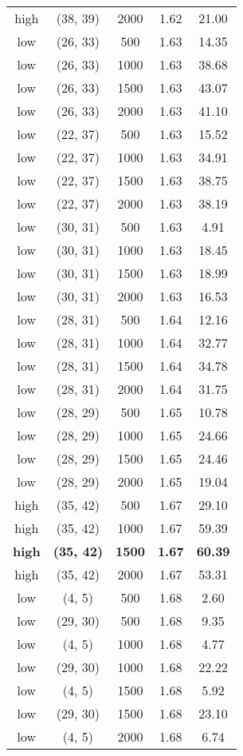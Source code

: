 \begin{tabular}{c c c c c}
high & (38, 39) &  2000 & 1.62 & 21.00 \\
low & (26, 33) &  500 & 1.63 & 14.35 \\
low & (26, 33) &  1000 & 1.63 & 38.68 \\
low & (26, 33) &  1500 & 1.63 & 43.07 \\
low & (26, 33) &  2000 & 1.63 & 41.10 \\
low & (22, 37) &  500 & 1.63 & 15.52 \\
low & (22, 37) &  1000 & 1.63 & 34.91 \\
low & (22, 37) &  1500 & 1.63 & 38.75 \\
low & (22, 37) &  2000 & 1.63 & 38.19 \\
low & (30, 31) &  500 & 1.63 & 4.91 \\
low & (30, 31) &  1000 & 1.63 & 18.45 \\
low & (30, 31) &  1500 & 1.63 & 18.99 \\
low & (30, 31) &  2000 & 1.63 & 16.53 \\
low & (28, 31) &  500 & 1.64 & 12.16 \\
low & (28, 31) &  1000 & 1.64 & 32.77 \\
low & (28, 31) &  1500 & 1.64 & 34.78 \\
low & (28, 31) &  2000 & 1.64 & 31.75 \\
low & (28, 29) &  500 & 1.65 & 10.78 \\
low & (28, 29) &  1000 & 1.65 & 24.66 \\
low & (28, 29) &  1500 & 1.65 & 24.46 \\
low & (28, 29) &  2000 & 1.65 & 19.04 \\
high & (35, 42) &  500 & 1.67 & 29.10 \\
high & (35, 42) &  1000 & 1.67 & 59.39 \\
\textbf{high} & \textbf{(35, 42)} & \textbf{ 1500} & \textbf{1.67} & \textbf{60.39} \\
high & (35, 42) &  2000 & 1.67 & 53.31 \\
low & (4, 5) &  500 & 1.68 & 2.60 \\
low & (29, 30) &  500 & 1.68 & 9.35 \\
low & (4, 5) &  1000 & 1.68 & 4.77 \\
low & (29, 30) &  1000 & 1.68 & 22.22 \\
low & (4, 5) &  1500 & 1.68 & 5.92 \\
low & (29, 30) &  1500 & 1.68 & 23.10 \\
low & (4, 5) &  2000 & 1.68 & 6.74 \\

\end{tabular}
